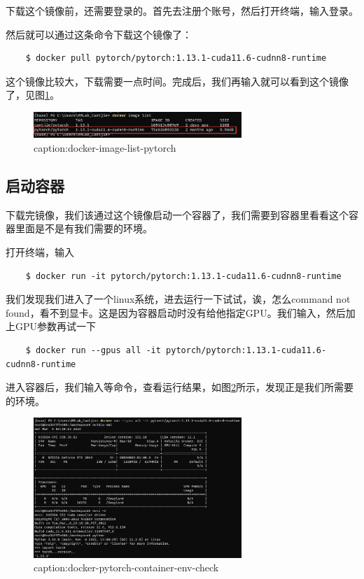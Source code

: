 下载这个镜像前，还需要登录的。首先去注册个账号，然后打开终端，输入登录。

然后就可以通过这条命令下载这个镜像了：

\begin{lstlisting}
    $ docker pull pytorch/pytorch:1.13.1-cuda11.6-cudnn8-runtime
\end{lstlisting}


这个镜像比较大，下载需要一点时间。完成后，我们再输入就可以看到这个镜像了，见图\ref{fig:docker-image-list-pytorch}。
\begin{figure}[htbp]
	\centering
	\includegraphics[width=0.7\textwidth]{figures/docker-image-list-pytorch.png}
	\caption{caption:docker-image-list-pytorch}
	\label{fig:docker-image-list-pytorch}
\end{figure}

\subsection{启动容器}

下载完镜像，我们该通过这个镜像启动一个容器了，我们需要到容器里看看这个容器里面是不是有我们需要的环境。

打开终端，输入
\begin{lstlisting}
    $ docker run -it pytorch/pytorch:1.13.1-cuda11.6-cudnn8-runtime
\end{lstlisting}
我们发现我们进入了一个linux系统，进去运行一下试试，诶，怎么command not found，看不到显卡。这是因为容器启动时没有给他指定GPU。我们输入，然后加上GPU参数再试一下
\begin{lstlisting}
    $ docker run --gpus all -it pytorch/pytorch:1.13.1-cuda11.6-cudnn8-runtime 
\end{lstlisting}

进入容器后，我们输入等命令，查看运行结果，如图\ref{fig:docker-pytorch-container-env-check}所示，发现正是我们所需要的环境。
\begin{figure}[htbp]
	\centering
	\includegraphics[width=0.7\textwidth]{figures/docker-pytorch-container-env-check.png}
	\caption{caption:docker-pytorch-container-env-check}
	\label{fig:docker-pytorch-container-env-check}
\end{figure}



